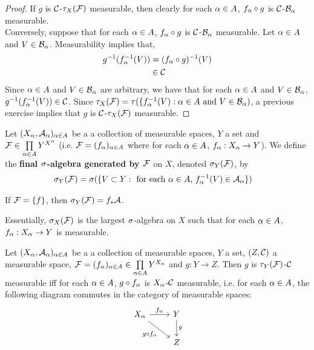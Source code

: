 \documentclass{book}
\begin{document}
	\begin{proof}
		If $g$ is $\mathcal{C}$-$\tau_X(\mathcal{F})$ measurable, then clearly for each $\alpha \in A$, $ f_{\alpha} \circ g$ is $\mathcal{C}$-$\mathcal{B}_{\alpha}$ measurable. \\
		Conversely, suppose that for each $\alpha \in A$, $f_{\alpha} \circ g$ is $\mathcal{C}$-$\mathcal{B}_{\alpha}$ measurable. Let $\alpha \in A$ and $V \in \mathcal{B}_{\alpha}$. Measurability implies that,
		\begin{align*}
			g^{-1}(f_{\alpha}^{-1}(V)) 
			& = (f_{\alpha} \circ g)^{-1}(V) \\
			& \in \mathcal{C}
		\end{align*}
		Since $\alpha \in A$ and $V \in \mathcal{B}_{\alpha}$ are arbitrary, we have that for each $\alpha \in A$ and $V \in \mathcal{B}_{\alpha}$, $g^{-1}(f_{\alpha}^{-1}(V)) \in \mathcal{C}$. Since $\tau_X(\mathcal{F}) = \tau(\{f_{\alpha}^{-1}(V): \alpha \in A \text{ and } V \in \mathcal{B}_{\alpha})$, a previous exercise implies that $g$ is $\mathcal{C}$-$\tau_X(\mathcal{F})$  measurable.
	\end{proof}
	
	\begin{defn} 
		Let $(X_{\alpha}, \mathcal{A}_{\alpha})_{\alpha \in A}$ be a a collection of measurable spaces, $Y$ a set and $\mathcal{F} \in \prod \limits_{\alpha \in A}Y^{X^{\alpha}}$ (i.e. $\mathcal{F} = (f_{\alpha})_{\alpha \in A}$ where for each $\alpha \in A$, $f_{\alpha}:X_{\alpha} \rightarrow Y$). We define the \textbf{final $\sigma$-algebra generated by $\mathcal{F}$} on $X$, denoted $\sigma_Y(\mathcal{F})$, by 
		\begin{align*}
			\sigma_Y(\mathcal{F}) 
			&= \sigma(\{V \subset Y: \text{ for each $\alpha \in A$, $f_{\alpha}^{-1}(V) \in \mathcal{A}_{\alpha}$}\})
		\end{align*}	 
	\end{defn}
	
	\begin{note}
		If $\mathcal{F} = \{f\}$, then $\sigma_Y(\mathcal{F}) = f_*\mathcal{A}$.
	\end{note}
	
	\begin{note}
		Essentially, $\sigma_X(\mathcal{F})$ is the largest $\sigma$-algebra on $X$ such that for each $\alpha \in A$, $f_{\alpha}:X_{\alpha} \rightarrow Y$ is measurable. 
	\end{note}
	
	\begin{ex} 
		Let $(X_{\alpha}, \mathcal{A}_{\alpha})_{\alpha \in A}$ be a a collection of measurable spaces, $Y$ a set, $(Z, \mathcal{C})$ a measurable space, $\mathcal{F} = (f_{\alpha})_{\alpha \in A} \in \prod \limits_{\alpha \in A}Y^{X_{\alpha}}$ and $g: Y \rightarrow Z$. Then $g$ is $\tau_Y(\mathcal{F})$-$\mathcal{C}$ measurable iff for each $\alpha \in A$, $g \circ f_{\alpha}$ is $X_{\alpha}$-$\mathcal{C}$ measurable, i.e. for each $\alpha \in A$, the following diagram commutes in the category of measurable spaces: 
		\[ \begin{tikzcd}
			X_{\al} \arrow[r, "f_{\al}"] \arrow[dr, "g \circ f_{\al}"'] 	
			& Y  \arrow[d, "g"] \\
			& Z 
		\end{tikzcd}
		\]
	\end{ex}
	
\end{document}
